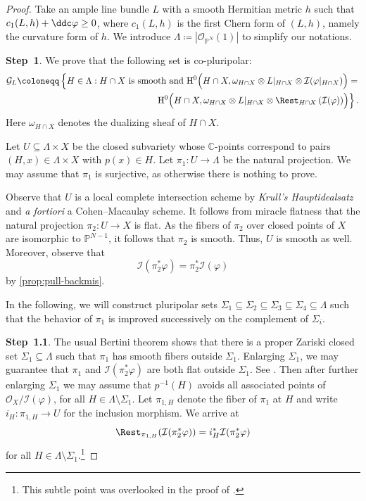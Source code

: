 \begin{proof}

Take an ample line bundle $L$ with a smooth Hermitian metric $h$ such that $c_1(L,h)+\ddc\varphi\geq 0$, where $c_1(L,h)$ is the first Chern form of $(L,h)$, namely the curvature form of $h$.
We introduce $\Lambda\coloneqq |\mathcal{O}_{\mathbb{P}^N}(1)|$ to simplify our notations.

\textbf{Step~1}.
We prove that the following set is co-pluripolar:
\[
\begin{split}
\mathcal{G}_{L}\coloneqq \left\{H\in \Lambda: H\cap X \text{ is smooth and } \mathrm{H}^0\Bigl(H\cap X,\omega_{H\cap X}\otimes L|_{H\cap X}\otimes \mathcal{I}(\varphi|_{H\cap X})\Bigr)= \right.\\
\left. \mathrm{H}^0\Bigl(H\cap X,\omega_{H\cap X}\otimes L|_{H\cap X}\otimes \Rest_{H\cap X}\left(\mathcal{I}(\varphi)\right)\Bigr)\right\}.
\end{split}
\]
Here $\omega_{H\cap X}$ denotes the dualizing sheaf of $H\cap X$.

Let $U\subseteq \Lambda\times X$ be the closed subvariety whose $\mathbb{C}$-points correspond to pairs $(H,x)\in \Lambda\times X$ with $p(x)\in H$.
Let $\pi_1\colon U\rightarrow \Lambda$ be the natural projection. We may assume that $\pi_1$ is surjective, as otherwise there is nothing to prove.

Observe that $U$ is a local complete intersection scheme by \emph{Krull's Hauptidealsatz} and \emph{a fortiori} a Cohen--Macaulay scheme. It follows from miracle flatness \cite[Theorem~23.1]{Mat89} that the natural projection $\pi_2\colon U\rightarrow X$ is flat. As the fibers of $\pi_2$ over closed points of $X$ are isomorphic to $\mathbb{P}^{N-1}$, it follows that $\pi_2$ is smooth. Thus, $U$ is smooth as well. Moreover, observe that
\begin{equation}\label{eq:pi2pullvarphiItemp1}
    \mathcal{I}(\pi_2^*\varphi)=\pi_2^*\mathcal{I}(\varphi)
\end{equation}
by \cref{prop:pull-backmis}.

In the following, we will construct pluripolar sets $\Sigma_1\subseteq \Sigma_2 \subseteq \Sigma_3\subseteq \Sigma_4\subseteq \Lambda$ such that the behavior of $\pi_1$ is improved successively on the complement of $\Sigma_i$.


\textbf{Step~1.1}.
The usual Bertini theorem shows that there is a proper Zariski closed set $\Sigma_1\subseteq \Lambda$ such that $\pi_1$ has smooth fibers outside $\Sigma_1$. Enlarging $\Sigma_1$, we may guarantee that $\pi_1$ and $\mathcal{I}(\pi_2^*\varphi)$ are both flat outside $\Sigma_1$. See \cite[Théorème~6.9.1]{EGAIV2}.
Then after further enlarging $\Sigma_1$ we may assume that $p^{-1}(H)$ avoids all associated points of $\mathcal{O}_X/\mathcal{I}(\varphi)$, for all $H\in \Lambda\setminus \Sigma_1$. Let $\pi_{1,H}$ denote the fiber of $\pi_1$ at $H$ and write $i_H\colon \pi_{1,H}\rightarrow U$ for the inclusion morphism.
We arrive at
\[
\Rest_{\pi_{1,H}}(\mathcal{I}(\pi_2^*\varphi))=i_H^*\mathcal{I}(\pi_2^*\varphi)
\]
for all $H\in \Lambda\setminus \Sigma_1$.\footnote{This subtle point was overlooked in the proof of \cite{XiaBer}.}


\end{proof}
